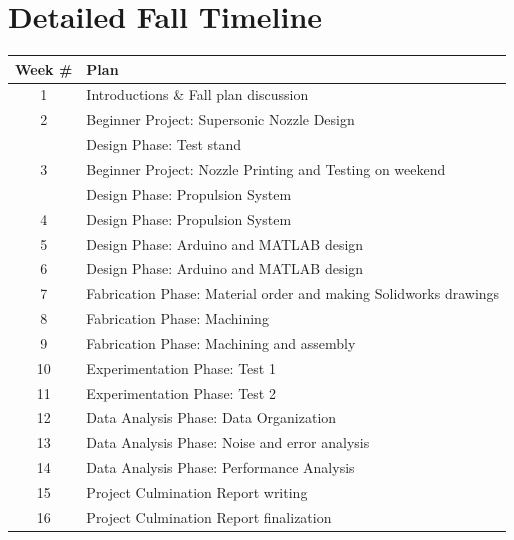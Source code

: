 \documentclass[conference]{IEEEtran} %
\begin{document}
\section{\textbf{Detailed Fall Timeline}}
\centering
\begin{tabular}{ c l }
  Week \# & Plan \\
  \hline
  1 & Introductions \& Fall plan discussion \\

  2 & Beginner Project: Supersonic Nozzle Design  \\
  & Design Phase: Test stand \\

  3 & Beginner Project: Nozzle Printing and Testing on weekend \\
  & Design Phase: Propulsion System \\

  4 & Design Phase: Propulsion System \\

  5 & Design Phase: Arduino and MATLAB design \\

  6 & Design Phase: Arduino and MATLAB design \\

  7 & Fabrication Phase: Material order and making Solidworks drawings\\

  8 & Fabrication Phase: Machining \\

  9 & Fabrication Phase: Machining and assembly \\

  10 & Experimentation Phase: Test 1 \\

  11 & Experimentation Phase: Test 2 \\

  12 & Data Analysis Phase: Data Organization \\

  13 & Data Analysis Phase: Noise and error analysis \\

  14 & Data Analysis Phase: Performance Analysis \\

  15 & Project Culmination Report writing \\

  16 & Project Culmination Report finalization \\

\end{tabular}
\label{table: fall-plan}
\end{document}
